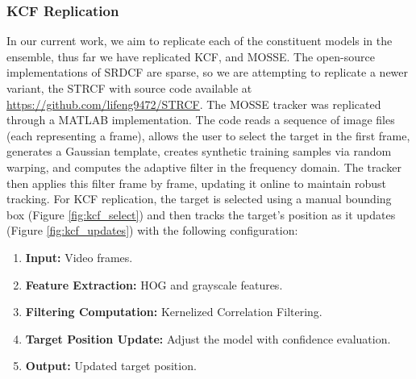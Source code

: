 \documentclass[11pt, letterpaper]{article}
\begin{document}
\subsubsection{KCF Replication}

In our current work, we aim to replicate each of the constituent models in the ensemble, thus far we have replicated KCF, and MOSSE. The open-source implementations of SRDCF are sparse, so we are attempting to replicate a newer variant, the STRCF \cite{li_learning_2018} with source code available at \underline{\href{https://github.com/lifeng9472/STRCF}{https://github.com/lifeng9472/STRCF}}. The MOSSE tracker was replicated through a MATLAB implementation. The code reads a sequence of image files (each representing a frame), allows the user to select the target in the first frame, generates a Gaussian template, creates synthetic training samples via random warping, and computes the adaptive filter in the frequency domain. The tracker then applies this filter frame by frame, updating it online to maintain robust tracking. For KCF replication, the target is selected using a manual bounding box (Figure \ref{fig:kcf_select}) and then tracks the target's position as it updates (Figure \ref{fig:kcf_updates}) with the following configuration:

\begin{enumerate}
  \item \textbf{Input:} Video frames.
  \item \textbf{Feature Extraction:} HOG and grayscale features.
  \item \textbf{Filtering Computation:} Kernelized Correlation Filtering.
  \item \textbf{Target Position Update:} Adjust the model with confidence evaluation.
  \item \textbf{Output:} Updated target position.
\end{enumerate}
\end{document}
